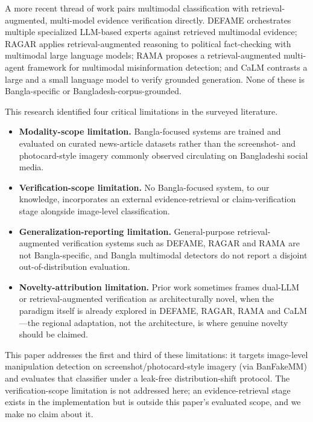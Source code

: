 \documentclass[conference,a4paper]{IEEEtran}
\begin{document}
A more recent thread of work pairs multimodal classification with
retrieval-augmented, multi-model evidence verification directly. DEFAME
\cite{defame} orchestrates multiple specialized LLM-based experts against
retrieved multimodal evidence; RAGAR \cite{ragar} applies retrieval-augmented
reasoning to political fact-checking with multimodal large language models;
RAMA \cite{rama} proposes a retrieval-augmented multi-agent framework for
multimodal misinformation detection; and CaLM \cite{calm} contrasts a large
and a small language model to verify grounded generation. None of these is
Bangla-specific or Bangladesh-corpus-grounded.

This research identified four critical limitations in the surveyed literature.

\begin{itemize}
\item \textbf{Modality-scope limitation.} Bangla-focused systems are trained
and evaluated on curated news-article datasets rather than the screenshot- and
photocard-style imagery commonly observed circulating on Bangladeshi social
media.

\item \textbf{Verification-scope limitation.} No Bangla-focused system, to our
knowledge, incorporates an external evidence-retrieval or claim-verification
stage alongside image-level classification.

\item \textbf{Generalization-reporting limitation.} General-purpose
retrieval-augmented verification systems such as DEFAME, RAGAR and RAMA are
not Bangla-specific, and Bangla multimodal detectors do not report a disjoint
out-of-distribution evaluation.

\item \textbf{Novelty-attribution limitation.} Prior work sometimes frames
dual-LLM or retrieval-augmented verification as architecturally novel, when
the paradigm itself is already explored in DEFAME, RAGAR, RAMA and CaLM---the
regional adaptation, not the architecture, is where genuine novelty should be
claimed.
\end{itemize}

This paper addresses the first and third of these limitations: it targets
image-level manipulation detection on screenshot/photocard-style imagery (via
BanFakeMM) and evaluates that classifier under a leak-free distribution-shift
protocol. The verification-scope limitation is not addressed here; an
evidence-retrieval stage exists in the implementation but is outside this
paper's evaluated scope, and we make no claim about it.
\end{document}
